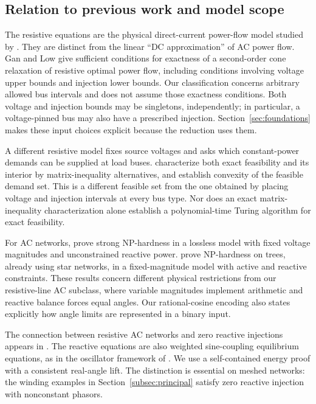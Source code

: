 \subsection{Relation to previous work and model scope}

The resistive equations are the physical direct-current power-flow model
studied by \citet{GanLow2014}. They are distinct from the linear ``DC
approximation'' of AC power flow. Gan and Low give sufficient conditions for
exactness of a second-order cone relaxation of resistive optimal power flow,
including conditions involving voltage upper bounds and injection lower
bounds. Our classification concerns arbitrary allowed bus intervals and does
not assume those exactness conditions. Both voltage and injection bounds may
be singletons, independently; in particular, a voltage-pinned bus may also
have a prescribed injection. Section~\ref{sec:foundations} makes these input
choices explicit because the reduction uses them.

A different resistive model fixes source voltages and asks which
constant-power demands can be supplied at load buses.
\citet[Theorem 3.22]{JeeningaEtAl2023} characterize both exact feasibility and
its interior by matrix-inequality alternatives, and establish convexity of
the feasible demand set. This is a different feasible set from the one
obtained by placing voltage and injection intervals at every bus type.
Nor does an exact matrix-inequality characterization alone establish a
polynomial-time Turing algorithm for exact feasibility.

For AC networks, \citet{BienstockVerma2019} prove strong NP-hardness in a
lossless model with fixed voltage magnitudes and unconstrained reactive
power. \citet{LehmannEtAl2016} prove NP-hardness on trees, already using star
networks, in a fixed-magnitude model with active and reactive constraints.
These results concern different physical restrictions from our resistive-line
AC subclass, where variable magnitudes implement arithmetic and reactive
balance forces equal angles. Our rational-cosine encoding also states
explicitly how angle limits are represented in a binary input.

The connection between resistive AC networks and zero reactive injections
appears in \citet[Appendix B, Case 2]{LavaeiLow2012}. The reactive equations
are also weighted sine-coupling equilibrium equations, as in the oscillator
framework of \citet{DorflerEtAl2013}. We use a self-contained energy proof
with a consistent real-angle lift. The distinction is essential on meshed
networks: the winding examples in Section~\ref{subsec:principal} satisfy
zero reactive injection with nonconstant phasors.

